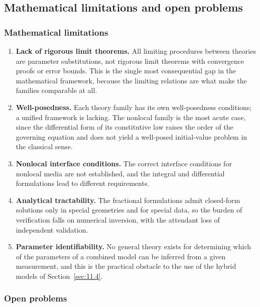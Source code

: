 \subsection{Mathematical limitations and open problems}
\label{sec:11.5}

\subsubsection{Mathematical limitations}

\begin{enumerate}
\item \textbf{Lack of rigorous limit theorems.} All limiting procedures between theories are parameter substitutions, not rigorous limit theorems with convergence proofs or error bounds. This is the single most consequential gap in the mathematical framework, because the limiting relations are what make the families comparable at all.
\item \textbf{Well-posedness.} Each theory family has its own well-posedness conditions; a unified framework is lacking. The nonlocal family is the most acute case, since the differential form of its constitutive law raises the order of the governing equation and does not yield a well-posed initial-value problem in the classical sense.
\item \textbf{Nonlocal interface conditions.} The correct interface conditions for nonlocal media are not established, and the integral and differential formulations lead to different requirements.
\item \textbf{Analytical tractability.} The fractional formulations admit closed-form solutions only in special geometries and for special data, so the burden of verification falls on numerical inversion, with the attendant loss of independent validation.
\item \textbf{Parameter identifiability.} No general theory exists for determining which of the parameters of a combined model can be inferred from a given measurement, and this is the practical obstacle to the use of the hybrid models of Section~\ref{sec:11.4}.
\end{enumerate}

\subsubsection{Open problems}

